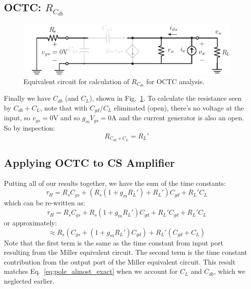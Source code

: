 \subsection{OCTC: \texorpdfstring{$R_{C_{db}}$}{Equivalent Drain-Body Capacitor Resistance}}
\begin{figure}[tb]
\centering
\includegraphics[scale=1]{cs_amp_ac_caps_Cdb}
\caption{Equivalent circuit for calculation of $R_{C_{db}}$ for OCTC analysis.} \label{fig:cs_amp_ac_caps_Cdb}
\end{figure}
Finally we have $C_{db}$ (and $C_L$), shown in Fig.~\ref{fig:cs_amp_ac_caps_Cdb}. To calculate the resistance seen by $C_{db} + C_L$, note that with $C_{gd}$/$C_L$ eliminated (open), there's no voltage at the input, so $v_{gs} = 0$V and so $g_m V_{gs} = 0$A and the current generator is also an open.  So by inspection:
    \begin{equation}
        {R_{{C_{db}}+C_L}} = R_L'
    \end{equation}
\subsection{Applying OCTC to CS Amplifier}
Putting all of our results together, we have the sum of the time constants:
    \begin{equation} 
        {\tau _H} = R_s{C_{gs}} + \left( {R_s(1 + {g_m}R_L') + R_L'} \right){C_{gd}} + R_L'{C_L}
    \end{equation}
which can be re-written as:
    \begin{equation} 
        {\tau _H} = R_s{C_{gs}} + R_s(1 + {g_m}R_L'){C_{gd}} + R_L'{C_{gd}} + R_L'{C_L} 
    \end{equation}
or approximately:
    \begin{equation} 
        \approx R_s\left( {{C_{gs}} + (1 + {g_m}R_L'){C_{gd}}} \right) + R_L'\left( {{C_{gd}} + {C_L}} \right)
    \end{equation}
Note that the first term is the same as the time constant from input port resulting from the Miller equivalent circuit.  The second term is the time constant contribution from the output port of the Miller equivalent circuit.  This result matches Eq.~\ref{eq:pole_almost_exact} when we account for $C_L$ and $C_{db}$, which we neglected earlier.
